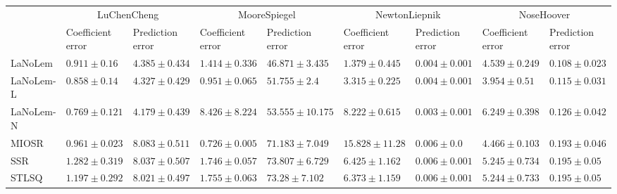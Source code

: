\begin{table*}
{\begin{tabular}{lllllllll}
 & \multicolumn{2}{c}{LuChenCheng} & \multicolumn{2}{c}{MooreSpiegel} & \multicolumn{2}{c}{NewtonLiepnik} & \multicolumn{2}{c}{NoseHoover} \\
 & Coefficient error & Prediction error & Coefficient error & Prediction error & Coefficient error & Prediction error & Coefficient error & Prediction error \\
\midrule
LaNoLem & $0.911\pm 0.16$ & $4.385\pm 0.434$ & $1.414\pm 0.336$ & $\mathbf{46.871}\pm 3.435$ & $\mathbf{1.379}\pm 0.445$ & $0.004\pm 0.001$ & $4.539\pm 0.249$ & $\mathbf{0.108}\pm 0.023$ \\
LaNoLem-L & $0.858\pm 0.14$ & $4.327\pm 0.429$ & $0.951\pm 0.065$ & $51.755\pm 2.4$ & $3.315\pm 0.225$ & $0.004\pm 0.001$ & $\mathbf{3.954}\pm 0.51$ & $0.115\pm 0.031$ \\
LaNoLem-N & $\mathbf{0.769}\pm 0.121$ & $\mathbf{4.179}\pm 0.439$ & $8.426\pm 8.224$ & $53.555\pm 10.175$ & $8.222\pm 0.615$ & $\mathbf{0.003}\pm 0.001$ & $6.249\pm 0.398$ & $0.126\pm 0.042$ \\
MIOSR & $0.961\pm 0.023$ & $8.083\pm 0.511$ & $\mathbf{0.726}\pm 0.005$ & $71.183\pm 7.049$ & $15.828\pm 11.28$ & $0.006\pm 0.0$ & $4.466\pm 0.103$ & $0.193\pm 0.046$ \\
SSR & $1.282\pm 0.319$ & $8.037\pm 0.507$ & $1.746\pm 0.057$ & $73.807\pm 6.729$ & $6.425\pm 1.162$ & $0.006\pm 0.001$ & $5.245\pm 0.734$ & $0.195\pm 0.05$ \\
STLSQ & $1.197\pm 0.292$ & $8.021\pm 0.497$ & $1.755\pm 0.063$ & $73.28\pm 7.102$ & $6.373\pm 1.159$ & $0.006\pm 0.001$ & $5.244\pm 0.733$ & $0.195\pm 0.05$ \\

\bottomrule
\end{tabular}
}
\end{table*}
